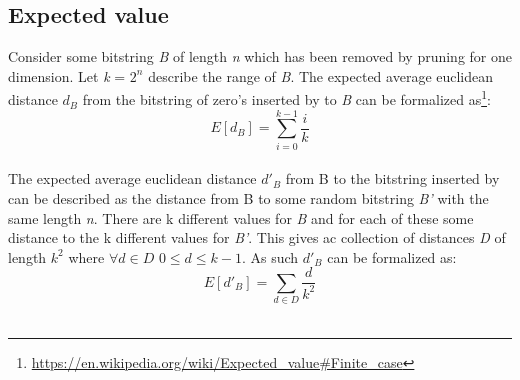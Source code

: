 \subsection{Expected value}
Consider some bitstring \textit{B} of length \textit{n} which has been removed by \qs{} pruning for one dimension. Let \textit{k} = $2^n$ describe the range of \textit{B}. The expected average euclidean distance \textit{$d_B$} from the bitstring of zero's inserted by \qs{} to \textit{B} can be formalized as\footnote{\url{https://en.wikipedia.org/wiki/Expected_value\#Finite_case}}:
\\
$$E[\textit{$d_B$}] = \sum_{i=0}^{k - 1} \dfrac{i}{k}$$
\\
The expected average euclidean distance \textit{$d'_B$} from B to the bitstring inserted by \qsr{} can be described as the distance from B to some random bitstring \textit{B'} with the same length \textit{n}. There are k different values for \textit{B} and for each of these some distance to the k different values for \textit{B'}. This gives ac collection of distances \textit{D} of length $k^2$ where $\forall{}\textit{d}\in{}\textit{D}$ $0\leq{}d\leq{}k-1$. As such \textit{$d'_B$} can be formalized as:
\\
$$E[\textit{$d'_B$}] = \sum_{d\in\textit{D}}^{}\dfrac{d}{k^2}$$
\\
